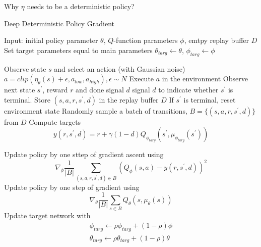 \documentclass{article}
\begin{document}
Why $\eta$ needs to be a deterministic policy? 

\begin{algorithm}[H]
\caption{Deep Deterministic Policy Gradient}
\label{alg}
\end{algorithm}

\begin{algorithmic}
\STATE Input: initial policy parameter $\theta$, $Q$-function 
parameters $\phi$, emtpy replay buffer $D$
\STATE Set target parameters equal to main parameters 
$\theta_{targ} \leftarrow \theta$, $\phi_{targ} \leftarrow \phi$

\REPEAT
\STATE Observe state $s$ and select an action (with Gaussian noise)
$a = clip(\eta_{\theta}(s) + \epsilon, a_{low}, a_{high}), 
\epsilon \sim N$
\STATE Execute $a$ in the environment
\STATE Observe next state $s^{\prime}$, reward $r$ and done signal 
$d$ signal $d$ to indicate whether $s^{\prime}$ is terminal.
\STATE Store $(s, a, r, s^{\prime}, d)$ in the replay buffer $D$
\STATE If $s^{\prime}$ is terminal, reset environment state 
\STATE Randomly sample a batch of transitions, 
$B = \{(s, a, r, s^{\prime}, d)\}$ from $D$
\STATE Compute targets
\[
    y(r, s^{\prime}, d) = r + \gamma(1-d)Q_{\phi_{targ}}(
        s^{\prime}, \mu_{\phi_{targ}}(s^{\prime})
        )
\]

\STATE Update policy by one sttep of gradient ascent using
\[
\nabla_{\phi}\frac{1}{|B|}\sum_{(s,a,r,s^{\prime},d)\in B}
(Q_{\phi}(s, a) - y(r, s^{\prime}, d))^2
\]
\STATE Update policy by one step of gradient using
\[
    \nabla_{\theta} \frac{1}{|B|}\sum_{s\in B} 
        Q_{\theta}(s, \mu_{\theta}(s))
\]
\STATE Update target network with 
\begin{align}
    \phi_{targ} \leftarrow \rho \phi_{targ} + (1-\rho)\phi \\
    \theta_{targ} \leftarrow \rho \theta_{targ} + (1-\rho)\theta
\end{align}
\ENDFOR
\ENDIF
{}

\end{algorithmic}
\end{document}
